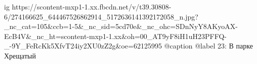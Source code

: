  
 
 
 
 

\ifcmt
  ig https://scontent-mxp1-1.xx.fbcdn.net/v/t39.30808-6/274166625_644467526862914_5172636141392172058_n.jpg?_nc_cat=105&ccb=1-5&_nc_sid=5cd70e&_nc_ohc=SDnNyY8AKyoAX-EcB4V&_nc_ht=scontent-mxp1-1.xx&oh=00_AT9yF8iH1uH23PFFQ-_-9Y_FeRcKk5XfvT24iy2XU0zZ2g&oe=62125995
  @caption @label 23: В парке Хрещатый
\fi
